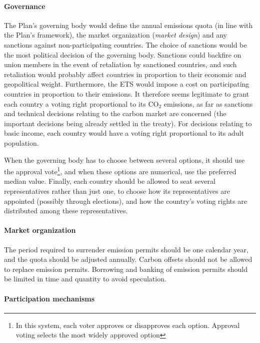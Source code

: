 \documentclass[a5paper,french,openany]{memoir}
\begin{document}
{\paragraph{Governance} 
The Plan's governing body would define the annual emissions quota (in line with the Plan's framework), the market organization (\textit{market design}) and any sanctions against non-participating countries. %
The choice of sanctions would be the most political decision of the governing body. Sanctions could backfire on union members in the event of retaliation by sanctioned countries, and such retaliation would probably affect countries in proportion to their economic and geopolitical weight. 
Furthermore, the ETS would impose a cost on participating countries in proportion to their emissions. It therefore seems legitimate to grant each country a voting right proportional to its CO$_\text{2}$ emissions, as far as sanctions and technical decisions relating to the carbon market are concerned (the important decisions being already settled in the treaty). 
For decisions relating to basic income, each country would have a voting right proportional to its adult population. 

When the governing body has to choose between several options, it should use the approval vote\footnote{In this system, each voter approves or disapproves each option. Approval voting selects the most widely approved option}, and when these options are numerical, use the preferred median value. Finally, each country should be allowed to seat several representatives rather than just one, to choose how its representatives are appointed (possibly through elections), and how the country's voting rights are distributed among these representatives. 


\paragraph{Market organization} 
The period required to surrender emission permits should be one calendar year, and the quota should be adjusted annually. Carbon offsets should not be allowed to replace emission permits. Borrowing and banking of emission permits should be limited in time and quantity to avoid speculation. %

\paragraph{Participation mechanisms}

}
\end{document}
